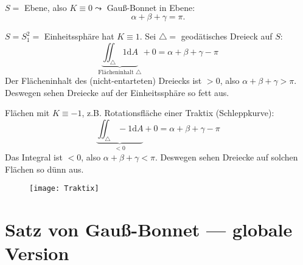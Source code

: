 \begin{remark}
  \
  \begin{enumerate}

    \item \( S = \) Ebene, also \( K \equiv 0 \leadsto \) Gauß-Bonnet in Ebene:
    \begin{equation*}
      \alpha + \beta + \gamma = \pi\text{.}
    \end{equation*}

    \begin{minipage}{.675\textwidth}
      \item \( S = S_1^2 =  \) Einheitssphäre hat \( K \equiv 1 \). Sei \( \triangle = \) geodätisches Dreieck auf \( S \):
      \begin{equation*}
        \underbrace{\iint_\triangle 1\text{d}A}_{\text{Flächeninhalt } \triangle} + 0 = \alpha + \beta + \gamma - \pi
      \end{equation*}
      Der Flächeninhalt des (nicht-entarteten) Dreiecks ist \( > 0 \), also \( \alpha + \beta + \gamma > \pi \). Deswegen sehen Dreiecke auf der Einheitssphäre so fett aus.

      \item Flächen mit \( K \equiv -1 \), z.B. Rotationsfläche einer Traktix (Schleppkurve):
      \begin{equation*}
        \underbrace{\iint_\triangle -1\text{d}A}_{< 0} + 0 = \alpha + \beta + \gamma - \pi
      \end{equation*}
      Das Integral ist \( < 0 \), also \( \alpha + \beta + \gamma < \pi \). Deswegen sehen Dreiecke auf solchen Flächen so dünn aus.
    \end{minipage}
    \hfill
    \begin{minipage}{.3\textwidth}
      \begin{figure}[H]
        \texttt{[image: Traktix]}
      \end{figure}
    \end{minipage}

  \end{enumerate}
\end{remark}

\section{Satz von Gauß-Bonnet --- globale Version}

